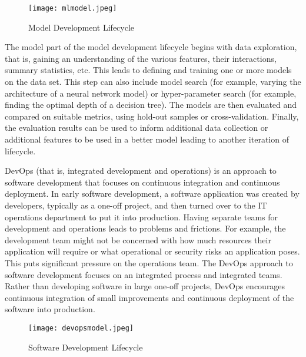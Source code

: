 \begin{figure}[h]
\centering
\texttt{[image: mlmodel.jpeg]}
\caption{Model Development Lifecycle}
\label{fig:modellifecycle}
\end{figure}

The model part of the model development lifecycle begins with data exploration, that is, gaining an understanding of the various features, their interactions, summary statistics, etc. This leads to defining and training one or more models on the data set. This step can also include model search (for example, varying the architecture of a neural network model) or hyper-parameter search (for example, finding the optimal depth of a decision tree). The models are then evaluated and compared on suitable metrics, using hold-out samples or cross-validation. Finally, the evaluation results can be used to inform additional data collection or additional features to be used in a better model leading to another iteration of lifecycle.

DevOps (that is, integrated development and operations) is an approach to software development that focuses on continuous integration and continuous deployment. In early software development, a software application was created by developers, typically as a one-off project, and then turned over to the IT operations department to put it into production. Having separate teams for development and operations leads to problems and frictions. For example, the development team might not be concerned with how much resources their application will require or what operational or security risks an application poses. This puts significant pressure on the operations team. The DevOps approach to software development focuses on an integrated process and integrated teams. Rather than developing software in large one-off projects, DevOps encourages continuous integration of small improvements and continuous deployment of the software into production. 

\begin{figure}[h]
\centering
\texttt{[image: devopsmodel.jpeg]}
\caption{Software Development Lifecycle}
\label{fig:devopsmodel}
\end{figure}

